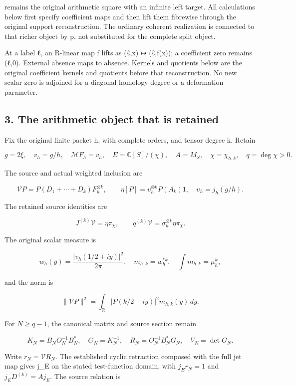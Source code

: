 remains the original arithmetic square with an infinite left target. All calculations below first specify coefficient maps and then lift them fibrewise through the original support reconstruction. The ordinary coherent realization is connected to that richer object by p, not substituted for the complete split object.

At a label ℓ, an R-linear map f lifts as (ℓ,x) ↦ (ℓ,f(x)); a coefficient zero remains (ℓ,0). External absence maps to absence. Kernels and quotients below are the original coefficient kernels and quotients before that reconstruction. No new scalar zero is adjoined for a diagonal homology degree or a deformation parameter.

\subsection{3. The arithmetic object that is retained}\label{endpoint-sga_trace_period--the-arithmetic-object-that-is-retained}

Fix the original finite packet h, with complete orders, and tensor degree k. Retain

\[
g=2\xi,\quad v_h=g/h,\quad \mathcal MF_h=v_h,
\quad E=\mathbb C[S]/(\chi),\quad A=M_S,
\quad\chi=\chi_{h,k},\quad q=\deg\chi>0.
\tag{5}
\]

The source and actual weighted inclusion are

\[
\mathcal V P=P(D_1+\cdots+D_k)F_h^{\otimes k},
\qquad
\eta[P]=\upsilon_h^{\otimes k}P(A_k)1,
\quad \upsilon_h=j_h(g/h).
\tag{6}
\]

The retained source identities are

\[
J^{(k)}\mathcal V=\eta\pi_\chi,
\qquad q^{(k)}\mathcal V
 =\sigma_h^{\otimes k}\eta\pi_\chi.
\tag{7}
\]

The original scalar measure is

\[
w_h(y)=\frac{|v_h(1/2+iy)|^2}{2\pi},\quad
m_{h,k}=w_h^{*k},\quad\int m_{h,k}=\mu_h^k,
\tag{8}
\]

and the norm is

\[
\|\mathcal VP\|^2
 =\int_{\mathbb R}|P(k/2+iy)|^2m_{h,k}(y)\,dy.
\tag{9}
\]

For \(N\ge q-1\), the canonical matrix and source section remain

\[
K_N=B_NO_N^{-1}B_N^*,\quad G_N=K_N^{-1},\quad
R_N=O_N^{-1}B_N^*G_N,\quad V_N=\det G_N.
\tag{10}
\]

Write \(r_N=\mathcal V R_N\). The established cyclic retraction composed with the full jet map gives j\_E on the stated test-function domain, with \(j_Er_N=1\) and \(j_ED^{(k)}=Aj_E\). The source relation is

